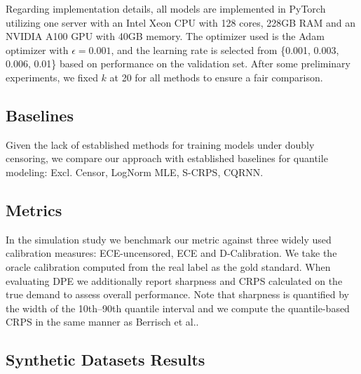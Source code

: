 \documentclass[sigconf]{acmart}
\begin{document}
Regarding implementation details, all models are implemented in PyTorch utilizing one server with an Intel Xeon CPU with 128 cores, 228GB RAM and an NVIDIA A100 GPU with 40GB memory. The optimizer used is the Adam optimizer with $\epsilon = 0.001$, and the learning rate is selected from \{0.001, 0.003, 0.006, 0.01\} based on performance on the validation set.  After some preliminary experiments, we fixed $k$ at 20 for all methods to ensure a fair comparison.



\subsection{Baselines}
Given the lack of established methods for training models under doubly censoring, we compare our approach with established baselines for quantile modeling: Excl. Censor\citep{pearce2022censored}, LogNorm MLE\citep{pearce2022censored}, S-CRPS\citep{avati2020countdown}, CQRNN\citep{pearce2022censored}.

\subsection{Metrics}
In the simulation study we benchmark our metric against three widely used calibration measures: ECE-uncensored, ECE\citep{cui2020calibrated,guo2017calibration,chung2021beyond,tran2020methods} and D-Calibration\citep{haider2020effective}. We take the oracle calibration computed from the real label as the gold standard. When evaluating DPE we additionally report sharpness and CRPS\citep{gneiting2007strictly} calculated on the true demand to assess overall performance. Note that sharpness is quantified by the width of the 10th–90th quantile interval and we compute the quantile-based CRPS in the same manner as Berrisch et al.\citep{berrisch2023crps}.


\subsection{Synthetic Datasets Results}
\end{document}
